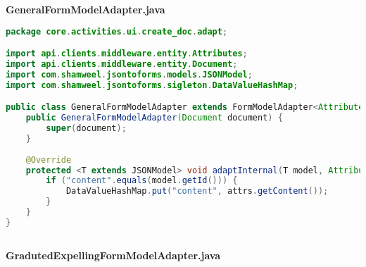 \textbf{GeneralFormModelAdapter.java}
\begin{lstlisting}[language=Java]
package core.activities.ui.create_doc.adapt;

import api.clients.middleware.entity.Attributes;
import api.clients.middleware.entity.Document;
import com.shamweel.jsontoforms.models.JSONModel;
import com.shamweel.jsontoforms.sigleton.DataValueHashMap;

public class GeneralFormModelAdapter extends FormModelAdapter<Attributes> {
	public GeneralFormModelAdapter(Document document) {
		super(document);
	}
	
	@Override
	protected <T extends JSONModel> void adaptInternal(T model, Attributes attrs) {
		if ("content".equals(model.getId())) {
			DataValueHashMap.put("content", attrs.getContent());
		}
	}
}
	
\end{lstlisting}
\textbf{GradutedExpellingFormModelAdapter.java}
